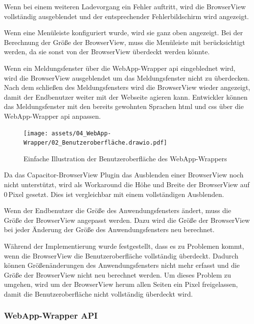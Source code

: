 Wenn bei einem weiteren Ladevorgang ein Fehler auftritt, wird die BrowserView vollständig ausgeblendet und der entsprechender Fehlerbildschirm wird angezeigt.

Wenn eine Menüleiste konfiguriert wurde, wird sie ganz oben angezeigt.
Bei der Berechnung der Größe der BrowserView, muss die Menüleiste mit berücksichtigt werden, da sie sonst von der BrowserView überdeckt werden könnte.

\newpage

Wenn ein Meldungsfenster über die WebApp-Wrapper \ac{api} eingeblednet wird, wird die BrowserView ausgeblendet um das Meldungsfenster nicht zu überdecken.
Nach dem schließen des Meldungsfensters wird die BrowserView wieder angezeigt, damit der Endbenutzer weiter mit der Webseite agieren kann.
Entwickler können das Meldungsfenster mit den bereits gewohnten Sprachen \ac{html} und \ac{css} über die WebApp-Wrapper \ac{api} anpassen.

\begin{figure}[H]
  \centering
  \texttt{[image: assets/04\_WebApp-Wrapper/02\_Benutzeroberfläche.drawio.pdf]}
  \caption[WebApp-Wrapper / Benutzeroberfläche]{Einfache Illustration der Benutzeroberfläche des WebApp-Wrappers}
\end{figure}

Da das Capacitor-BrowserView Plugin das Ausblenden einer BrowserView noch nicht unterstützt, wird als Workaround die Höhe und Breite der BrowserView auf 0\,Pixel gesetzt.
Dies ist vergleichbar mit einem vollständigen Ausblenden.

Wenn der Endbenutzer die Größe des Anwendungsfensters ändert, muss die Größe der BrowserView angepasst werden.
Dazu wird die Größe der BrowserView bei jeder Änderung der Größe des Anwendungsfensters neu berechnet.

Während der Implementierung wurde festgestellt, dass es zu Problemen kommt, wenn die BrowserView die Benutzeroberfläche vollständig überdeckt.
Dadurch können Größenänderungen des Anwendungsfensters nicht mehr erfasst und die Größe der BrowserView nicht neu berechnet werden.
Um dieses Problem zu umgehen, wird um der BrowserView herum allen Seiten ein Pixel freigelassen, damit die Benutzeroberfläche nicht vollständig überdeckt wird.

\newpage

\subsubsection{WebApp-Wrapper API}

